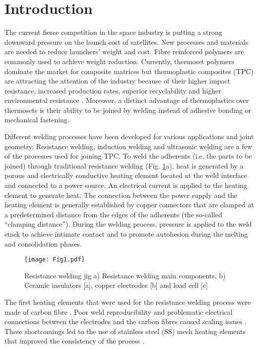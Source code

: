 \section{Introduction}

The current fierce competition in the space industry is putting a strong downward pressure on the launch cost of satellites. 
New processes and materials are needed to reduce launchers' weight and cost. 
Fibre reinforced polymers are commonly used to achieve weight reduction. 
Currently, thermoset polymers dominate the market for composite matrices but thermoplastic composites (TPC) are attracting the attention of the industry \cite{CompositeWorldSloan2018} because of their higher impact resistance, increased production rates, superior recyclability and higher environmental resistance \cite{cogswell1992}. 
Moreover, a distinct advantage of thermoplastics over thermosets is their ability to be joined by welding instead of adhesive bonding or mechanical fastening. 

Different welding processes have been developed for various applications and joint geometry. 
Resistance welding, induction welding and ultrasonic welding are a few of the processes used for joining TPC. 
To weld the adherents (i.e. the parts to be joined) through traditional resistance welding (Fig. \ref{fig:welding_jig}a), heat is generated by a porous and electrically conductive heating element located at the weld interface and connected to a power source. 
An electrical current is applied to the heating element to generate heat. 
The connection between the power supply and the heating element is generally established by copper connectors that are clamped at a predetermined distance from the edges of the adherents (the so-called “clamping distance”). 
During the welding process, pressure is applied to the weld stack to achieve intimate contact and to promote autohesion during the melting and consolidation phases. 

\begin{figure}[h]
	\centering
	\texttt{[image: Fig1.pdf]}
	\caption{Resistance welding jig a) Resistance welding main components, b) Ceramic insulators [a], copper electrodes [b] and load cell [c] \cite{Brassard2018_figshare_article1}}
	\label{fig:welding_jig}
\end{figure}

\FloatBarrier
The first heating elements that were used for the resistance welding process were made of carbon fibre  \cite{Ageorges2000a,houghton1984bonding,Eveno1988}.
Poor weld reproducibility and problematic electrical connections between the electrodes and the carbon fibres caused scaling issues \cite{McKnight1997}. 
These shortcomings led to the use of stainless steel (SS) mesh heating elements that improved the consistency of the process \cite{Hou1999a}.

